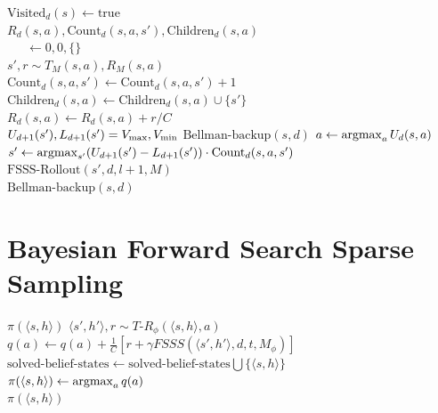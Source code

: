 \begin{algorithm}[tb]
	\caption{$\mbox{FSSS-Rollout}(s, d, l, M)$}
	\label{alg:fs3-rollout}
	 {
		\Return
	}
	 {
		$\mbox{Visited}_d(s) \leftarrow \mbox{true}$\\
		 {
			$R_d(s,a),\mbox{Count}_d(s,a,s'),\mbox{Children}_d(s,a)$\\
			\ \ \ $\leftarrow 0, 0, \{\}$\\
			 {
				$s', r \sim T_M(s, a), R_M(s,a)$ \\
				$\mbox{Count}_d(s,a,s') \leftarrow \mbox{Count}_d(s,a,s') + 1$ \\
				$\mbox{Children}_d(s,a) \leftarrow \mbox{Children}_d(s,a) \cup \{s'\}$ \\
				$R_d(s,a) \leftarrow R_d(s, a)+r/C$\\
				 {
					 $U_{d+1}(s'), L_{d+1}(s') = V_{\rm max}, V_{\rm min}$
				}
			}
		}
		$\mbox{Bellman-backup}(s, d)$
	}
	$a \leftarrow \argmax_a U_d(s,a)$\\
	$s' \leftarrow \argmax_{s'} (U_{d+1}(s')-L_{d+1}(s')) \cdot \mbox{Count}_d(s,a,s')$\\
	$\mbox{FSSS-Rollout}(s', d, l+1, M)$\\
	$\mbox{Bellman-backup}(s, d)$\\
	\Return
\end{algorithm}

\section{Bayesian Forward Search Sparse Sampling}

\label{sec:bfs3:bfs3}

\begin{algorithm}[tb]
	\caption{$\mbox{BFS3}(s, h, d, t, \phi)$}
	\label{alg:bfs3}
	 {
		\Return $\pi(\langle s,h \rangle)$
	}
	 {
		 {
			$\langle s', h'\rangle , r \sim {T\mbox{-}R}_\phi(\langle s,h\rangle, a)$
			$q(a) \leftarrow q(a) + \frac 1 C \left[r+ \gamma FSSS(\langle s', h'\rangle, d, t, M_\phi)\right]$
		}
	}
	$\mbox{solved-belief-states} \leftarrow \mbox{solved-belief-states} \bigcup \{\langle s,h\rangle\}$\\
	$\pi(\langle s,h\rangle) \leftarrow \argmax_a q(a)$\\
	\Return $\pi(\langle s,h\rangle)$\\
\end{algorithm}


